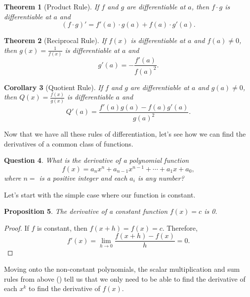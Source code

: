 \documentclass[12pt]{article}
\newtheorem{thm}{Theorem}[section]
\newtheorem{cor}[thm]{Corollary}
\newtheorem{prop}[thm]{Proposition}
\newtheorem{quest}[thm]{Question}
\theoremstyle{definition}
\theoremstyle{plain}
\numberwithin{equation}{section}
\begin{document}
\begin{thm}[Product Rule]
	If $f$ and $g$ are differentiable at $a$, then $f\cdot g$ is differentiable at $a$ and \begin{equation}
		(f\cdot g)'=f'(a)\cdot g(a)+f(a)\cdot g'(a).
	\end{equation}
\end{thm}

\begin{thm}[Reciprocal Rule]
If $f(x)$ is differentiable at $a$ and $f(a)\neq 0$, then $g(x)=\frac{1}{f(x)}$ is differentiable at $a$ and
\begin{equation}
g'(a)=-\frac{f'(a)}{f(a)^2}.
\end{equation}
\end{thm}

\begin{cor}[Quotient Rule]
	If $f$ and $g$ are differentiable at $a$ and $g(a)\neq 0$, then $Q(x)=\frac{f(x)}{g(x)}$ is differentiable $a$ and
	\begin{equation}
		Q'(a)=\frac{f'(a)g(a)-f(a)g'(a)}{g(a)^2}.
	\end{equation}
\end{cor}


Now that we have all these rules of differentiation, let's see how we can find the derivatives of a common class of functions.

\begin{quest}
	What is the derivative of a polynomial function
	\begin{equation}
		f(x)=a_nx^n+a_{n-1}x^{n-1}+\dotsb+ a_1x+a_0,
	\end{equation}
	where $n=$ is a positive integer and each $a_i$ is any number?
\end{quest}

Let's start with the simple case where our function is constant.

\begin{prop}
The derivative of a constant function $f(x) =c$ is 0.
\end{prop}

\begin{proof}
If $f$ is constant, then $f(x + h) = f(x) = c$. Therefore,
\[
f'(x) = \lim\limits_{h\to 0} \frac{f(x+h)-f(x)}{h} = 0.
\]
\end{proof}

Moving onto the non-constant polynomials, the scalar multiplication and sum rules from above (\label{SMultSumDiff}) tell us that we only need to be able to find the derivative of each $x^k$ to find the derivative of $f(x)$.
\end{document}
